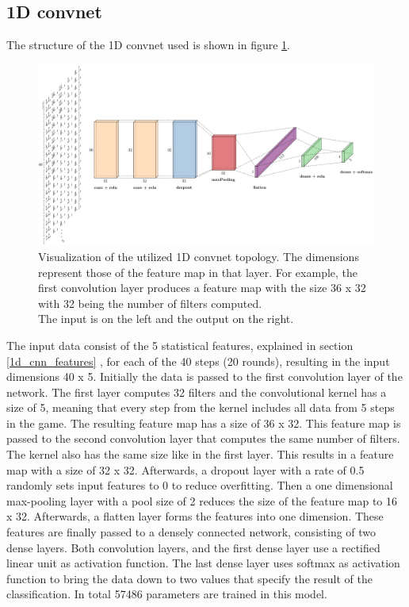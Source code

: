 \subsection{1D convnet}
\label{1d_cnn}
The structure of the 1D convnet used is shown in figure \ref{fig:1dCnnStructure}.
\begin{figure}[H]
	\centering
	\includegraphics[width=15cm]{images/1dCnnStructureChanged.png}
	\caption[Visualization of the utilized 1D convnet topology.]{Visualization of the utilized 1D convnet topology. The dimensions represent those of the feature map in that layer. For example, the first convolution layer produces a feature map with the size 36 x 32 with 32 being the number of filters computed.\\ The input is on the left and the output on the right.}
	\label{fig:1dCnnStructure}
\end{figure}
The input data consist of the 5 statistical features, explained in section \ref{1d_cnn_features} , for each of the 40 steps (20 rounds), resulting in the input dimensions 40 x 5. Initially the data is passed to the first convolution layer of the network. The first layer computes 32 filters and the convolutional kernel has a size of 5, meaning that every step from the kernel includes all data from 5 steps in the game. The resulting feature map has a size of 36 x 32. This feature map is passed to the second convolution layer that computes the same number of filters. The kernel also has the same size like in the first layer. This results in a feature map with a size of 32 x 32. Afterwards, a dropout layer with a rate of 0.5 randomly sets input features to 0 to reduce overfitting. Then a one dimensional max-pooling layer with a pool size of 2 reduces the size of the feature map to 16 x 32. Afterwards, a flatten layer forms the features into one dimension. These features are finally passed to a densely connected network, consisting of two dense layers. Both convolution layers, and the first dense layer use a rectified linear unit as activation function. The last dense layer uses softmax as activation function to bring the data down to two values that specify the result of the classification. In total 57486 parameters are trained in this model. 


